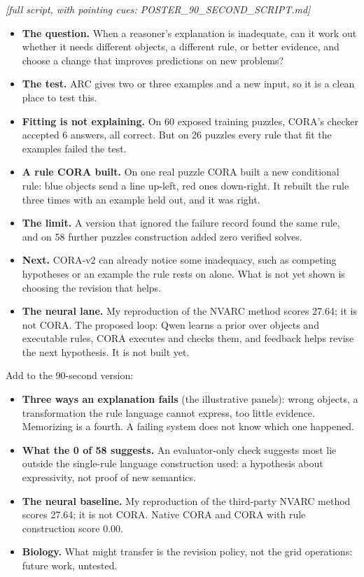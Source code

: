 \documentclass[11pt]{article}
\newcommand{\cue}[1]{{\color{ink2}\textit{[#1]}}\par}
\newcommand{\sub}[1]{\par\needspace{6\baselineskip}\vspace{0.5em}{\large\bfseries\color{accent}#1}\par}
\begin{document}
\sub{The 90-second version}
\cue{full script, with pointing cues: POSTER\_90\_SECOND\_SCRIPT.md}
\begin{itemize}
  \item \textbf{The question.} When a reasoner's explanation is inadequate, can it work out whether it needs
        different objects, a different rule, or better evidence, and choose a change that improves predictions on new
        problems?
  \item \textbf{The test.} ARC gives two or three examples and a new input, so it is a clean place to test this.
  \item \textbf{Fitting is not explaining.} On 60 exposed training puzzles, CORA's checker accepted 6 answers, all
        correct. But on 26 puzzles every rule that fit the examples failed the test.
  \item \textbf{A rule CORA built.} On one real puzzle CORA built a new conditional rule: blue objects send a line
        up-left, red ones down-right. It rebuilt the rule three times with an example held out, and it was right.
  \item \textbf{The limit.} A version that ignored the failure record found the same rule, and on 58 further puzzles
        construction added zero verified solves.
  \item \textbf{Next.} CORA-v2 can already notice some inadequacy, such as competing hypotheses or an example the
        rule rests on alone. What is not yet shown is choosing the revision that helps.
  \item \textbf{The neural lane.} My reproduction of the NVARC method scores 27.64; it is not CORA. The proposed loop:
        Qwen learns a prior over objects and executable rules, CORA executes and checks them, and feedback helps revise
        the next hypothesis. It is not built yet.
\end{itemize}

\sub{The two-minute version}
Add to the 90-second version:
\begin{itemize}
  \item \textbf{Three ways an explanation fails} (the illustrative panels): wrong objects, a transformation the rule
        language cannot express, too little evidence. Memorizing is a fourth. A failing system does not know which
        one happened.
  \item \textbf{What the 0 of 58 suggests.} An evaluator-only check suggests most lie outside the single-rule language
        construction used: a hypothesis about expressivity, not proof of new semantics.
  \item \textbf{The neural baseline.} My reproduction of the third-party NVARC method scores 27.64; it is not CORA.
        Native CORA and CORA with rule construction score 0.00.
  \item \textbf{Biology.} What might transfer is the revision policy, not the grid operations: future work, untested.
\end{itemize}
\end{document}
